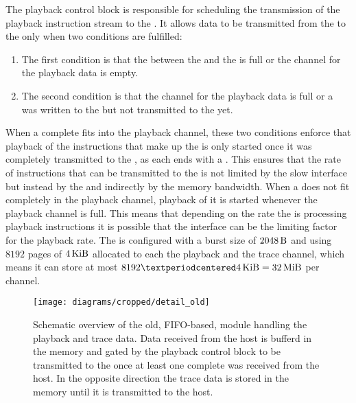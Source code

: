 The playback control block is responsible for scheduling the transmission of the playback instruction stream to the \pbexec{}.
It allows data to be transmitted from the \VFIFO{} to the \pbexec{} only when two conditions are fulfilled:
\begin{enumerate}
\item The first condition is that the \FIFO{} between the \VFIFO{} and the \pbexec{} is full or the \VFIFO{} channel for the playback data is empty.
\item The second condition is that the \VFIFO{} channel for the playback data is full or a \haltInstr{} was written to the \VFIFO{} but not transmitted to the \pbexec{} yet.
\end{enumerate}
When a complete \PlaybackProgram{} fits into the \VFIFO{} playback channel, these two conditions enforce that playback of the instructions that make up the \PlaybackProgram{} is only started once it was completely transmitted to the \VFIFO{}, as each \PlaybackProgram{} ends with a \haltInstr{}. This ensures that the rate of instructions that can be transmitted to the \pbexec{} is not limited by the slow \HostARQ{} interface but instead by the \VFIFO{} and indirectly by the \DDR{} memory bandwidth.
When a \PlaybackProgram{} does not fit completely in the \VFIFO{} playback channel, playback of it is started whenever the \VFIFO{} playback channel is full. This means that depending on the rate the \pbexec{} is processing playback instructions it is possible that the \HostARQ{} interface can be the limiting factor for the playback rate.
The \VFIFO{} is configured with a burst size of \(\SI{2048}{\byte}\) and using $\num{8192}$ pages of $\SI{4}{\kibi\byte}$ allocated to each the playback and the trace channel, which means it can store at most \(\num{8192} · \SI{4}{\kibi\byte} = \SI{32}{\mebi\byte}\) per channel.

\begin{figure}
\centerline{\texttt{[image: diagrams/cropped/detail\_old]}}
\caption{Schematic overview of the old, FIFO{}-based, module handling the playback and trace data. Data received from the host is bufferd in the \DDR{} memory and gated by the playback control block to be transmitted to the \pbexec{} once at least one complete \PlaybackProgram{} was received from the host. In the opposite direction the trace data is stored in the \DDR{} memory until it is transmitted to the host.}\label{diagram:detail_old}
\end{figure}

